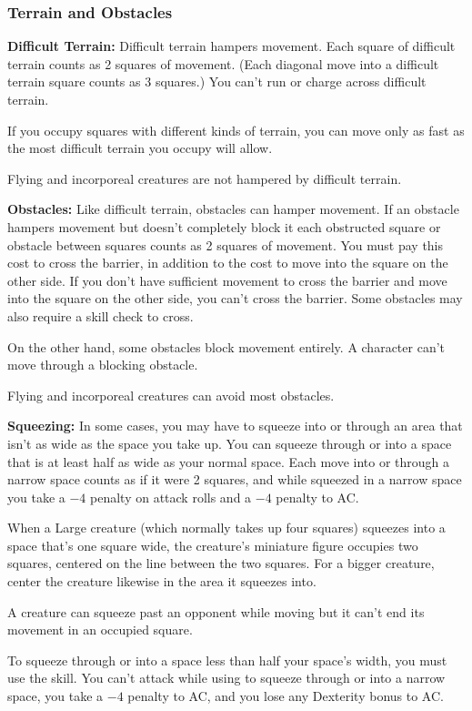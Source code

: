 \subsubsection{Terrain and Obstacles}
\textbf{Difficult Terrain:} Difficult terrain hampers movement. Each square of difficult terrain counts as 2 squares of movement. (Each diagonal move into a difficult terrain square counts as 3 squares.) You can't run or charge across difficult terrain.

If you occupy squares with different kinds of terrain, you can move only as fast as the most difficult terrain you occupy will allow.

Flying and incorporeal creatures are not hampered by difficult terrain.

\textbf{Obstacles:} Like difficult terrain, obstacles can hamper movement. If an obstacle hampers movement but doesn't completely block it each obstructed square or obstacle between squares counts as 2 squares of movement. You must pay this cost to cross the barrier, in addition to the cost to move into the square on the other side. If you don't have sufficient movement to cross the barrier and move into the square on the other side, you can't cross the barrier. Some obstacles may also require a skill check to cross.

On the other hand, some obstacles block movement entirely. A character can't move through a blocking obstacle.

Flying and incorporeal creatures can avoid most obstacles.

\textbf{Squeezing:} In some cases, you may have to squeeze into or through an area that isn't as wide as the space you take up. You can squeeze through or into a space that is at least half as wide as your normal space. Each move into or through a narrow space counts as if it were 2 squares, and while squeezed in a narrow space you take a $-4$ penalty on attack rolls and a $-4$ penalty to AC.

When a Large creature (which normally takes up four squares) squeezes into a space that's one square wide, the creature's miniature figure occupies two squares, centered on the line between the two squares. For a bigger creature, center the creature likewise in the area it squeezes into.

A creature can squeeze past an opponent while moving but it can't end its movement in an occupied square.

To squeeze through or into a space less than half your space's width, you must use the  skill. You can't attack while using  to squeeze through or into a narrow space, you take a $-4$ penalty to AC, and you lose any Dexterity bonus to AC.
